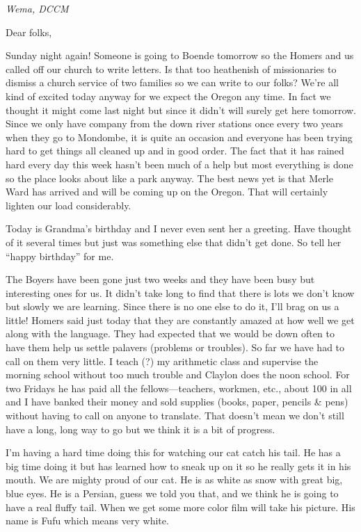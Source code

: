 \documentclass[
]{book}
\begin{document}
\emph{Wema, DCCM}

Dear folks,

Sunday night again! Someone is going to Boende tomorrow so the Homers and us called off our church to write letters. Is that too heathenish of missionaries to dismiss a church service of two families so we can write to our folks? We're all kind of excited today anyway for we expect the Oregon any time. In fact we thought it might come last night but since it didn't will surely get here tomorrow. Since we only have company from the down river stations once every two years when they go to Mondombe, it is quite an occasion and everyone has been trying hard to get things all cleaned up and in good order. The fact that it has rained hard every day this week hasn't been much of a help but most everything is done so the place looks about like a park anyway. The best news yet is that Merle Ward has arrived and will be coming up on the Oregon. That will certainly lighten our load considerably.

Today is Grandma's birthday and I never even sent her a greeting. Have thought of it several times but just was something else that didn't get done. So tell her ``happy birthday'' for me.

The Boyers have been gone just two weeks and they have been busy but interesting ones for us. It didn't take long to find that there is lots we don't know but slowly we are learning. Since there is no one else to do it, I'll brag on us a little! Homers said just today that they are constantly amazed at how well we get along with the language. They had expected that we would be down often to have them help us settle palavers (problems or troubles). So far we have had to call on them very little. I teach (?) my arithmetic class and supervise the morning school without too much trouble and Claylon does the noon school. For two Fridays he has paid all the fellows---teachers, workmen, etc., about 100 in all and I have banked their money and sold supplies (books, paper, pencils \& pens) without having to call on anyone to translate. That doesn't mean we don't still have a long, long way to go but we think it is a bit of progress.

I'm having a hard time doing this for watching our cat catch his tail. He has a big time doing it but has learned how to sneak up on it so he really gets it in his mouth. We are mighty proud of our cat. He is as white as snow with great big, blue eyes. He is a Persian, guess we told you that, and we think he is going to have a real fluffy tail. When we get some more color film will take his picture. His name is Fufu which means very white.
\end{document}
